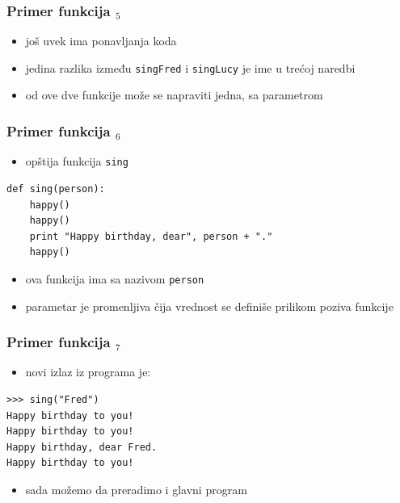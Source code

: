 \documentclass[compress]{beamer}
\begin{document}
\begin{frame}[fragile]
  \frametitle{Primer funkcija $_5$}
  \begin{itemize}
    \item još uvek ima ponavljanja koda
    \item jedina razlika između \texttt{singFred} i \texttt{singLucy} je ime u trećoj naredbi
    \item od ove dve funkcije može se napraviti jedna, sa parametrom
  \end{itemize}
\end{frame}

\begin{frame}[fragile]
  \frametitle{Primer funkcija $_6$}
  \begin{itemize}
    \item opštija funkcija \texttt{sing} 
  \end{itemize}
\begin{verbatim}
def sing(person):
    happy()
    happy()
    print "Happy birthday, dear", person + "."
    happy()
\end{verbatim}
  \begin{itemize}
    \item ova funkcija ima  sa nazivom \texttt{person}
    \item parametar je promenljiva čija vrednost se definiše prilikom poziva funkcije
  \end{itemize}
\end{frame}

\begin{frame}[fragile]
  \frametitle{Primer funkcija $_7$}
  \begin{itemize}
    \item novi izlaz iz programa je:
  \end{itemize}
\begin{verbatim}
>>> sing("Fred")
Happy birthday to you!
Happy birthday to you!
Happy birthday, dear Fred.
Happy birthday to you!
\end{verbatim}
  \begin{itemize}
    \item sada možemo da preradimo i glavni program
  \end{itemize}
\end{frame}
\end{document}
